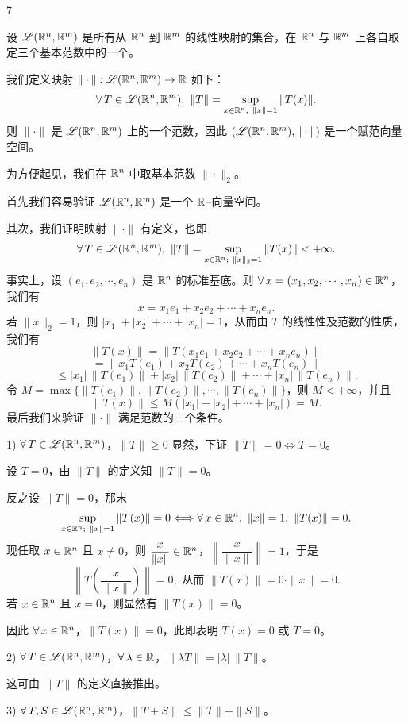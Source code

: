 \begin{sourceexample}{7}

设 $\mathscr{L}(\mathbb{R}^n,\mathbb{R}^m)$ 是所有从 $\mathbb{R}^n$ 到 $\mathbb{R}^m$ 的线性映射的集合，在 $\mathbb{R}^n$ 与 $\mathbb{R}^m$ 上各自取定三个基本范数中的一个。

我们定义映射 $\|\cdot\|:\mathscr{L}(\mathbb{R}^n,\mathbb{R}^m)\to\mathbb{R}$ 如下：
\[\forall\,T\in\mathscr{L}(\R^n,\R^m),\ \|T\|=\sup_{x\in\R^n,\ \|x\|=1}\|T(x)\|.\]
则 $\|\cdot\|$ 是 $\mathscr{L}(\mathbb{R}^n,\mathbb{R}^m)$ 上的一个范数，因此 $(\mathscr{L}(\mathbb{R}^n,\mathbb{R}^m),\|\cdot\|)$ 是一个赋范向量空间。

为方便起见，我们在 $\mathbb{R}^n$ 中取基本范数 $\|\cdot\|_2$。

首先我们容易验证 $\mathscr{L}(\mathbb{R}^n,\mathbb{R}^m)$ 是一个 $\mathbb{R}$--向量空间。

其次，我们证明映射 $\|\cdot\|$ 有定义，也即
\[\forall\,T\in\mathscr{L}(\R^n,\R^m),\ \|T\|=\sup_{x\in\R^n;\ \|x\|_2=1}\|T(x)\|<+\infty.\]
事实上，设 $(e_1,e_2,\cdots,e_n)$ 是 $\mathbb{R}^n$ 的标准基底。则 $\forall\,x=(x_1,x_2,\cdots,x_n)\in\mathbb{R}^n$，我们有
\[x=x_1e_1+x_2e_2+\cdots+x_ne_n.\]
若 $\|x\|_2=1$，则 $|x_1|+|x_2|+\cdots+|x_n|=1$，从而由 $T$ 的线性性及范数的性质，我们有
\[\|T(x)\|=\|T(x_1e_1+x_2e_2+\cdots+x_ne_n)\|\]
\[=\|x_1T(e_1)+x_2T(e_2)+\cdots+x_nT(e_n)\|\]
\[\leqslant|x_1|\,\|T(e_1)\|+|x_2|\,\|T(e_2)\|+\cdots+|x_n|\,\|T(e_n)\|.\]
令 $M=\max\{\|T(e_1)\|,\|T(e_2)\|,\cdots,\|T(e_n)\|\}$，则 $M<+\infty$，并且
\[\|T(x)\|\leqslant M(|x_1|+|x_2|+\cdots+|x_n|)=M.\]
最后我们来验证 $\|\cdot\|$ 满足范数的三个条件。

1) $\forall\,T\in\mathscr{L}(\mathbb{R}^n,\mathbb{R}^m)$，$\|T\|\geqslant0$ 显然，下证 $\|T\|=0\Longleftrightarrow T=0$。

设 $T=0$，由 $\|T\|$ 的定义知 $\|T\|=0$。

反之设 $\|T\|=0$，那末
\[\sup_{x\in\R^n;\ \|x\|=1}\|T(x)\|=0\Longleftrightarrow\forall\,x\in\R^n,\ \|x\|=1,\ \|T(x)\|=0.\]
现任取 $x\in\mathbb{R}^n$ 且 $x\neq0$，则 $\dfrac{x}{\|x\|}\in\mathbb{R}^n$，$\left\|\dfrac{x}{\|x\|}\right\|=1$，于是
\[\left\|T\left(\frac{x}{\|x\|}\right)\right\|=0,\text{ 从而 }\|T(x)\|=0\cdot\|x\|=0.\]
若 $x\in\mathbb{R}^n$ 且 $x=0$，则显然有 $\|T(x)\|=0$。

因此 $\forall\,x\in\mathbb{R}^n$，$\|T(x)\|=0$，此即表明 $T(x)=0$ 或 $T=0$。

2) $\forall\,T\in\mathscr{L}(\mathbb{R}^n,\mathbb{R}^m)$，$\forall\,\lambda\in\mathbb{R}$，$\|\lambda T\|=|\lambda|\,\|T\|$。

这可由 $\|T\|$ 的定义直接推出。

3) $\forall\,T,S\in\mathscr{L}(\mathbb{R}^n,\mathbb{R}^m)$，$\|T+S\|\leqslant\|T\|+\|S\|$。


\end{sourceexample}
